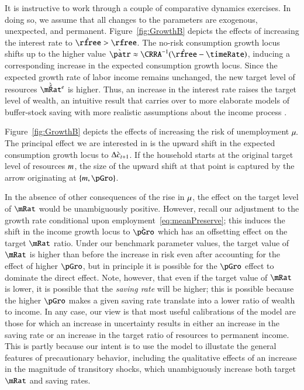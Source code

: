 \documentclass[titlepage,abstract]{\econtex}\newcommand{\texname}{ctDiscrete}
\begin{document}
It is instructive to work through a couple of comparative dynamics
exercises. In doing so, we assume that all changes to the parameters
are exogenous, unexpected, and permanent.  
Figure~\ref{fig:GrowthB} depicts the effects of increasing 
the interest rate to $\grave{\rfree}>\rfree$.
The no-risk consumption growth locus shifts
up to the higher value $\grave{\patr} \approx
\CRRA^{-1}(\grave{\rfree}-\timeRate)$, inducing a corresponding
increase in the expected consumption growth locus.  Since the expected
growth rate of labor income remains unchanged, the new target level of
resources $\grave{\check{\mRat}}^{e}$ is higher. Thus, an increase in
the interest rate raises the target level of wealth, an intuitive
result that carries over to more elaborate models of buffer-stock
saving with more realistic assumptions about the income process
\citep{BufferStockTheory}.



Figure~\ref{fig:GrowthB} depicts the effects of increasing the risk of unemployment $\mu.$
The principal effect we are interested in is the upward shift in the expected
consumption growth locus to $\Delta \grave{c}_{t+1}$.  If the
household starts at the original target level of resources
$m$, the size of the upward shift at that point is captured by the
arrow originating at $\{\mTarg,\pGro\}$.  

In the absence of other consequences of the rise in $\mu$, the
effect on the target level of $\mRat$ would be unambiguously positive.
However, recall our adjustment to the growth rate conditional upon
employment~\eqref{eq:meanPreserve}; this induces the shift in the
income growth locus to $\grave{\pGro}$ which has an offsetting effect
on the target $\mRat$ ratio.  Under our benchmark parameter values,
the target value of $\mRat$ is higher than before the increase in risk
even after accounting for the effect of higher $\pGro$, but in
principle it is possible for the $\pGro$ effect to dominate the direct
effect.  Note, however, that even if the target value of $\mRat$ is
lower, it is possible that the \textit{saving rate} will be higher; this
is possible because the higher $\pGro$ makes a given saving
rate translate into a lower ratio of wealth to income.  In any case,
our view is that most useful calibrations of the model are those for
which an increase in uncertainty results in either an increase in the
saving rate or an increase in the target ratio of resources to
permanent income.  This is partly because our intent is to use the
model to illustate the general features of precautionary behavior,
including the qualitative effects of an increase in the magnitude of
transitory shocks, which unambiguously increase both target $\mRat$
and saving rates.
\end{document}

